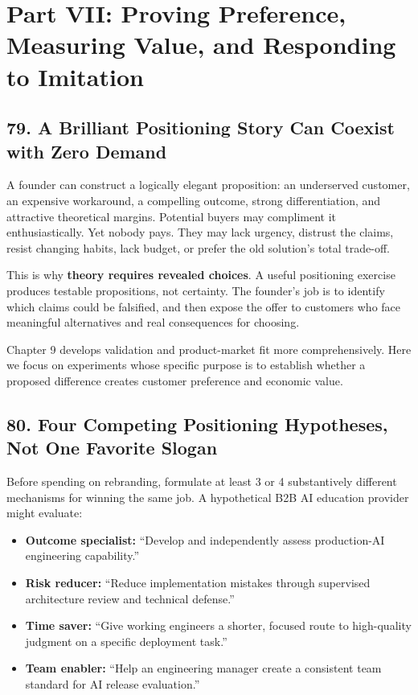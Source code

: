 \section*{Part VII: Proving Preference, Measuring Value, and Responding to Imitation}

\subsection*{79. A Brilliant Positioning Story Can Coexist with Zero Demand}

A founder can construct a logically elegant proposition: an underserved customer, an expensive workaround, a compelling outcome, strong differentiation, and attractive theoretical margins. Potential buyers may compliment it enthusiastically. Yet nobody pays. They may lack urgency, distrust the claims, resist changing habits, lack budget, or prefer the old solution's total trade-off.

This is why \textbf{theory requires revealed choices}. A useful positioning exercise produces testable propositions, not certainty. The founder's job is to identify which claims could be falsified, and then expose the offer to customers who face meaningful alternatives and real consequences for choosing.

Chapter 9 develops validation and product-market fit more comprehensively. Here we focus on experiments whose specific purpose is to establish whether a proposed difference creates customer preference and economic value.

\subsection*{80. Four Competing Positioning Hypotheses, Not One Favorite Slogan}

Before spending on rebranding, formulate at least 3 or 4 substantively different mechanisms for winning the same job. A hypothetical B2B AI education provider might evaluate:

\begin{itemize}
    \item \textbf{Outcome specialist:} ``Develop and independently assess production-AI engineering capability.''
    \item \textbf{Risk reducer:} ``Reduce implementation mistakes through supervised architecture review and technical defense.''
    \item \textbf{Time saver:} ``Give working engineers a shorter, focused route to high-quality judgment on a specific deployment task.''
    \item \textbf{Team enabler:} ``Help an engineering manager create a consistent team standard for AI release evaluation.''
\end{itemize}

